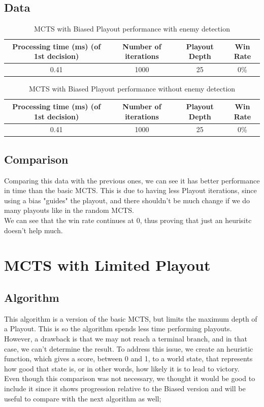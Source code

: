 \documentclass{article}
\begin{document}
  \newpage

  \subsection{Data}
  \begin{table}[h!]
    \centering
    \caption{MCTS with Biased Playout performance with enemy detection}
    \label{tab:tableBiasedMCTS1}
    \begin{tabular}{c|c|c|c}
      \textbf{Processing time (ms) (of 1st decision)} & \textbf{Number of iterations} & \textbf{Playout Depth} & \textbf{Win Rate}\\
      \hline
      0.41 & 1000 & 25 & 0\%
    \end{tabular}
  \end{table}
  \begin{table}[h!]
    \centering
    \caption{MCTS with Biased Playout performance without enemy detection}
    \label{tab:tableBiasedMCTS2}
    \begin{tabular}{c|c|c|c}
      \textbf{Processing time (ms) (of 1st decision)} & \textbf{Number of iterations} & \textbf{Playout Depth} & \textbf{Win Rate}\\
      \hline
      0.41 & 1000 & 25 & 0\%
    \end{tabular}
  \end{table}

  \subsection{Comparison}
  Comparing this data with the previous ones, we can see it has better performance in time than the basic MCTS. This is due to having less Playout iterations,
  since using a bias "guides" the playout, and there shouldn't be much change if we do many playouts like in the random MCTS.\\
  We can see that the win rate continues at 0, thus proving that just an heurisitc doesn't help much. 

  \section{MCTS with Limited Playout}

  \subsection{Algorithm}
  This algorithm is a version of the basic MCTS,  but limits the maximum depth of a Playout. This is so the algorithm spends less time performing playouts. However,
  a drawback is that we may not reach a terminal branch, and in that case, we can't determine the result. To address this issue, we create an heuristic function,
  which gives a score, between 0 and 1, to a world state, that represents how good that state is, or in other words, how likely it is to lead to victory. \\
  Even though this comparison was not necessary, we thought it would be good to include it since it shows progression relative to the Biased version and will be useful
  to compare with the next algorithm as well;
  
\end{document}
